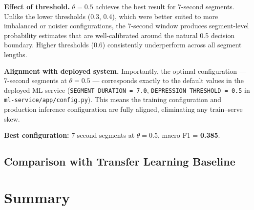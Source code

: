 \textbf{Effect of threshold.} $\theta = 0.5$ achieves the best result for 7-second segments. Unlike the lower thresholds (0.3, 0.4), which were better suited to more imbalanced or noisier configurations, the 7-second window produces segment-level probability estimates that are well-calibrated around the natural 0.5 decision boundary. Higher thresholds (0.6) consistently underperform across all segment lengths.

\textbf{Alignment with deployed system.} Importantly, the optimal configuration — 7-second segments at $\theta = 0.5$ — corresponds exactly to the default values in the deployed ML service (\texttt{SEGMENT\_DURATION\,=\,7.0}, \texttt{DEPRESSION\_THRESHOLD\,=\,0.5} in \texttt{ml-service/app/config.py}). This means the training configuration and production inference configuration are fully aligned, eliminating any train–serve skew.

\textbf{Best configuration:} 7-second segments at $\theta = 0.5$, macro-F1 = \textbf{0.385}.

\subsection{Comparison with Transfer Learning Baseline}

\begin{table}[h]
\centering
\caption{TSFEL+RF vs.\ wav2vec~2.0 transfer learning on DAIC-WOZ.}
\label{tab:model_comparison}
\end{table}

\section{Summary}

